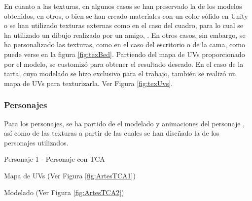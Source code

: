\documentclass[12pt, a4paper,twoside,titlepage]{book}
\begin{document}
En cuanto a las texturas, en algunos casos se han preservado la de los modelos obtenidos, en otros, o bien se han creado materiales con un color sólido en Unity o se han utilizado texturas externas como en el caso del cuadro, para lo cual se ha utilizado un dibujo realizado por un amigo, \cite{refdibujo}. En otros casos, sin embargo, se ha personalizado las texturas, como en el caso del escritorio o de la cama, como puede verse en la figura \ref{fig:texBed}. Partiendo del mapa de UVs proporcionado por el modelo, se customizó para obtener el resultado deseado. En el caso de la tarta, cuyo modelado se hizo exclusivo para el trabajo, también se realizó un mapa de UVs para texturizarla. Ver Figura \ref{fig:texUvs}. 



\subsubsection{Personajes}
\label{sec:diseñoPersonajes}
Para los personajes, se ha partido de el modelado y animaciones del personaje , así como de las texturas a partir de las cuales se han diseñado la de los personajes utilizados. 

 Personaje 1 - Personaje con TCA 
 
 Mapa de UVs (Ver Figura \ref{fig:ArtesTCA1})
 
 Modelado (Ver Figura \ref{fig:ArtesTCA2})
 
\end{document}
